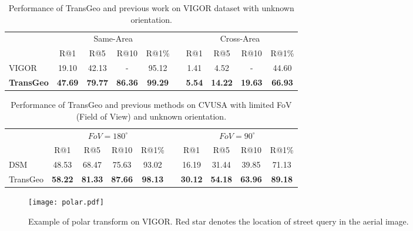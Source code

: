 \documentclass[10pt,twocolumn,letterpaper]{article}
\begin{document}
\begin{table*}[!htbp]
\centering
    \begin{tabular}{l c c c c c c c c c}
    \hline
    
    \hline & \multicolumn{4}{c}{Same-Area}& & \multicolumn{4}{c}{Cross-Area} \\
    \cline{2-5} \cline{7-10}
      ~ & R@1 & R@5 & R@10 & R@1\%  &  & R@1 & R@5 & R@10 & R@1\%  \\
     \hline
     \hline
     VIGOR \cite{zhu2021vigor} & 19.10 & 42.13 & - & 95.12 &  & 1.41 & 4.52 & - & 44.60  \\
\textbf{TransGeo}  & \textbf{47.69}  & \textbf{79.77}& \textbf{86.36} & \textbf{99.29} & & \textbf{5.54} & \textbf{14.22} & \textbf{19.63}  & \textbf{66.93} \\
    \hline
    
    \hline
    \end{tabular}
    \caption{Performance of TransGeo and previous work \cite{zhu2021vigor} on VIGOR dataset with unknown orientation.}
    \label{tab:vigor_orientation}
\end{table*}


\begin{table*}[!htbp]
\centering
    \begin{tabular}{l c c c c c c c c c}
    \hline
    
    \hline \multirow{2}{*}{}  & \multicolumn{4}{c}{\textbf{$FoV=180^{\circ}$}}& & \multicolumn{4}{c}{\textbf{$FoV=90^{\circ}$}} \\
    \cline{2-5} \cline{7-10} 
      ~ & R@1 & R@5 & R@10 & R@1\%   &  & R@1 & R@5 & R@10 & R@1\% \\
     \hline
     \hline
     DSM \cite{shi2020looking} & 48.53 & 68.47 & 75.63 & 93.02 &  & 16.19 & 31.44  & 39.85 & 71.13 \\
TransGeo & \textbf{58.22} & \textbf{81.33} & \textbf{87.66} & \textbf{98.13} & & \textbf{30.12} & \textbf{54.18}  & \textbf{63.96} & \textbf{89.18} \\
    \hline
    
    \hline
    \end{tabular}
    \caption{Performance of TransGeo and previous methods on CVUSA with limited FoV (Field of View) and unknown orientation.}
    \label{tab:fov}
\end{table*}
\begin{figure*}[!htbp]
    \centering
    \texttt{[image: polar.pdf]}
    \caption{Example of polar transform on VIGOR. Red star denotes the location of street query in the aerial image.}
    \label{fig:polar_vigor}
\end{figure*}
\end{document}
